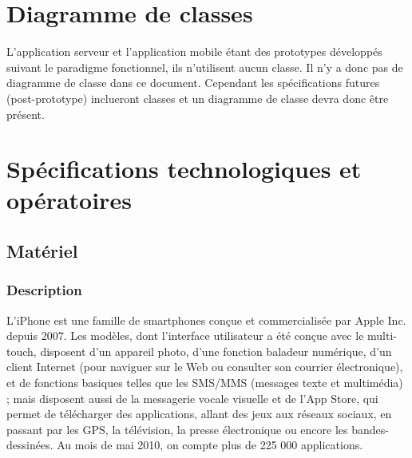 \documentclass[a4paper,12pt]{report}
\begin{document}
\begin{onehalfspace}
\begin{center}
\end{center}

\chapter{Diagramme de classes} %
\label{cha:diagramme_de_classes}

L'application serveur et l'application mobile étant des prototypes développés suivant le paradigme fonctionnel, ils n'utilisent aucun classe. Il n'y a donc pas de diagramme de classe dans ce document. Cependant les spécifications futures (post-prototype) inclueront classes et un diagramme de classe devra donc être présent.

\chapter{Spécifications technologiques et opératoires}


\section{Matériel}
\subsection{Description}
L'iPhone  est une famille de smartphones conçue et commercialisée par Apple Inc. depuis 2007. Les modèles, dont l'interface utilisateur a été conçue avec le multi-touch, disposent d'un appareil photo, d'une fonction baladeur numérique, d'un client Internet (pour naviguer sur le Web ou consulter son courrier électronique), et de fonctions basiques telles que les SMS/MMS (messages texte et multimédia) ; mais disposent aussi de la messagerie vocale visuelle et de l'App Store, qui permet de télécharger des applications, allant des jeux aux réseaux sociaux, en passant par les GPS, la télévision, la presse électronique ou encore les bandes-dessinées. Au mois de mai 2010, on compte plus de 225 000 applications.


\end{onehalfspace}
\end{document}
